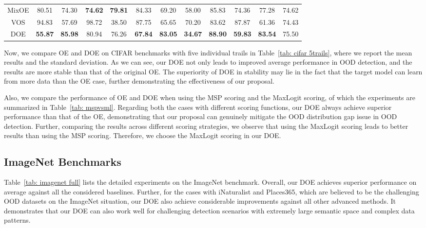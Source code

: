 \documentclass{article} \usepackage{iclr2022_conference,times}
\begin{document}
\begin{table}[t]
{\begin{tabular}{c|cccccccccc|c}
MixOE       & 80.51 & 74.30 & \textbf{74.62} & \textbf{79.81} & 84.33 & 69.20 & 58.00 & 85.83 & 74.36 & 77.28 & 74.62 \\
VOS         & 94.83 & 57.69 & 98.72 & 38.50 & 87.75 & 65.65 & 70.20 & 83.62 & 87.87 & 61.36 & 74.43 \\
\hline
DOE         & \textbf{55.87} & \textbf{85.98} & 80.94 & 76.26 & \textbf{67.84} & \textbf{83.05} & \textbf{34.67} & \textbf{88.90} & \textbf{59.83} & \textbf{83.54} & 75.50 \\
\bottomrule[1.5pt]   
\end{tabular}}
\end{table}
 
Now, we compare OE and DOE on CIFAR benchmarks with five individual trails in Table~\ref{tab: cifar 5trails}, where we report the mean results and the standard deviation. As we can see, our DOE not only leads to improved average performance in OOD detection, and the results are more stable than that of the original OE. The superiority of DOE in stability may lie in the fact that the target model can learn from more data than the OE case, further demonstrating the effectiveness of our proposal. 


Also, we compare the performance of OE and DOE when using the MSP scoring and the MaxLogit scoring, of which the experiments are summarized in Table~\ref{tab: mspvsml}. Regarding both the cases with different scoring functions, our DOE always achieve superior performance than that of the OE, demonstrating that our proposal can genuinely mitigate the OOD distribution gap issue in OOD detection. Further, comparing the results across different scoring strategies, we observe that using the MaxLogit scoring leads to better results than using the MSP scoring. Therefore, we choose the MaxLogit scoring in our DOE. 






\subsection{ImageNet Benchmarks}

Table~\ref{tab: imagenet full} lists the detailed experiments on the ImageNet benchmark. Overall, our DOE achieves superior performance on average against all the considered baselines. Further, for the cases with iNaturalist and  Places365, which are believed to be the challenging OOD datasets on the ImageNet situation, our DOE also achieve considerable improvements against all other advanced methods. It demonstrates that our DOE can also work well for challenging detection scenarios with extremely large semantic space and complex data patterns. 
\end{document}
